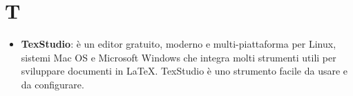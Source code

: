 \section{T}
\begin{itemize}
	\item
	\textbf{TexStudio}: è un editor gratuito, moderno e multi-piattaforma per Linux, sistemi Mac OS e Microsoft Windows che integra molti strumenti utili per sviluppare documenti in \LaTeX. TexStudio è uno strumento facile da usare e da configurare.
\end{itemize}

